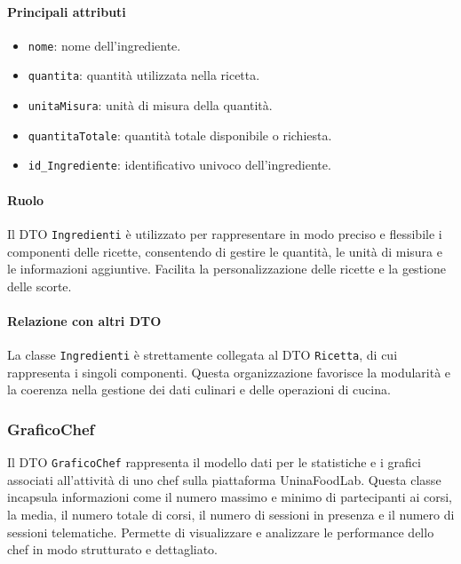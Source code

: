 \paragraph{Principali attributi}
\begin{itemize}
    \item \texttt{nome}: nome dell'ingrediente.
    \item \texttt{quantita}: quantità utilizzata nella ricetta.
    \item \texttt{unitaMisura}: unità di misura della quantità.
    \item \texttt{quantitaTotale}: quantità totale disponibile o richiesta.
    \item \texttt{id\_Ingrediente}: identificativo univoco dell'ingrediente.
\end{itemize}

\paragraph{Ruolo}
Il DTO \texttt{Ingredienti} è utilizzato per rappresentare in modo preciso e flessibile i componenti delle ricette, consentendo di gestire le quantità, le unità di misura e le informazioni aggiuntive. Facilita la personalizzazione delle ricette e la gestione delle scorte.

\paragraph{Relazione con altri DTO}
La classe \texttt{Ingredienti} è strettamente collegata al DTO \texttt{Ricetta}, di cui rappresenta i singoli componenti. Questa organizzazione favorisce la modularità e la coerenza nella gestione dei dati culinari e delle operazioni di cucina.

\subsubsection{GraficoChef}
Il DTO \texttt{GraficoChef} rappresenta il modello dati per le statistiche e i grafici associati all'attività di uno chef sulla piattaforma UninaFoodLab. Questa classe incapsula informazioni come il numero massimo e minimo di partecipanti ai corsi, la media, il numero totale di corsi, il numero di sessioni in presenza e il numero di sessioni telematiche. Permette di visualizzare e analizzare le performance dello chef in modo strutturato e dettagliato.

